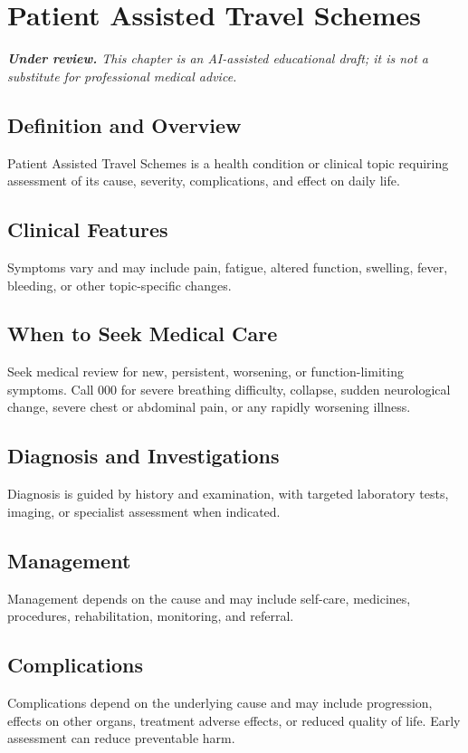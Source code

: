 \chapter{Patient Assisted Travel Schemes}

\medskip
\noindent\textit{\textbf{Under review.} This chapter is an AI-assisted educational draft; it is not a substitute for professional medical advice.}

\section*{Definition and Overview}
Patient Assisted Travel Schemes is a health condition or clinical topic requiring assessment of its cause, severity, complications, and effect on daily life.

\section*{Clinical Features}
Symptoms vary and may include pain, fatigue, altered function, swelling, fever, bleeding, or other topic-specific changes.

\section*{When to Seek Medical Care}
Seek medical review for new, persistent, worsening, or function-limiting symptoms. Call 000 for severe breathing difficulty, collapse, sudden neurological change, severe chest or abdominal pain, or any rapidly worsening illness.

\section*{Diagnosis and Investigations}
Diagnosis is guided by history and examination, with targeted laboratory tests, imaging, or specialist assessment when indicated.

\section*{Management}
Management depends on the cause and may include self-care, medicines, procedures, rehabilitation, monitoring, and referral.

\section*{Complications}
Complications depend on the underlying cause and may include progression, effects on other organs, treatment adverse effects, or reduced quality of life. Early assessment can reduce preventable harm.

